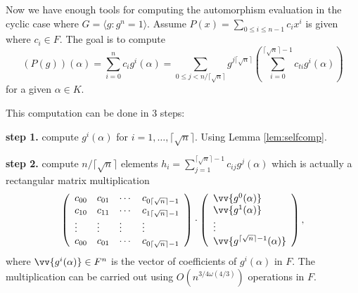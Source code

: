 \documentclass[sigconf]{acmart}
\newcommand{\osumcost}{O(n^{3/4 \omega(4/3)})}
\theoremstyle{acmplain}
\begin{document}
Now we have enough tools for computing the automorphism evaluation in the cyclic case where $G = \langle g: g^n =1 \rangle$. 
Assume $P(x) = \sum_{0 \leq i \leq n-1} c_ix^i$ is given where $c_i \in F$. The goal is to compute 
$$(P(g))(\alpha) = \sum_{i = 0}^{n} c_i g^i(\alpha) = \sum_{0 \leq j < n/\lceil \sqrt{n} \rceil} 
g^{j\lceil \sqrt{n} \rceil}(\sum_{i= 0}^{\lceil \sqrt{n} \rceil -1} c_{ti} g^i(\alpha)) $$
for a given $\alpha \in K$.  

This computation can be done in 3 steps:

\textbf{step 1.} compute $g^i(\alpha)$ for $i = 1, \ldots , \lceil \sqrt{n} \rceil$. Using Lemma \ref{lem:selfcomp}.

\textbf{step 2.} compute $n/\lceil \sqrt{n} \rceil$ elements $h_i = \sum_{j = 1}^ {\lceil \sqrt{n} \rceil-1}c_{ij}g^{j}(\alpha)$ which is actually a rectangular matrix multiplication 
\begin{equation}
\left(\begin{array}{llll}
c_{00} & c_{01} & \cdots & c_{0\lceil \sqrt{n} \rceil -1}\\
c_{10} & c_{11} & \cdots & c_{1\lceil \sqrt{n} \rceil -1}\\
\vdots & \vdots & \vdots & \vdots \\
c_{00} & c_{01} & \cdots & c_{0\lceil \sqrt{n} \rceil -1}\\
\end{array}\right)\cdot 
\left(\begin{array}{l}
\vv{g^0(\alpha)}\\
\vv{g^1(\alpha)}\\
\vdots\\
\vv{g^{\lceil \sqrt{n} \rceil -1}(\alpha)}
\end{array}\right),
\end{equation}
where $\vv{g^i(\alpha)} \in F^n$ is the vector of coefficients of $g^i(\alpha)$ in $F$. The multiplication can be 
carried out using $\osumcost$ operations in $F$.
\end{document}
